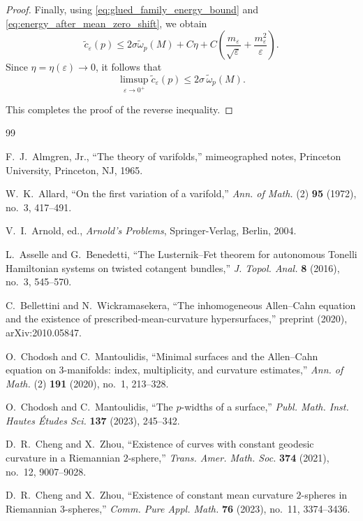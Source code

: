 \documentclass[12pt,english]{article}
\theoremstyle{definition}
\begin{document}
\begin{proof}
Finally, using \eqref{eq:glued_family_energy_bound} and
\eqref{eq:energy_after_mean_zero_shift}, we obtain
\[
\tilde c_\varepsilon(p)
\le
2\sigma\tilde\omega_p(M)+C\eta
+
C\left(\frac{m_\varepsilon}{\sqrt{\varepsilon}}+\frac{m_\varepsilon^2}{\varepsilon}\right).
\]
Since $\eta=\eta(\varepsilon)\to 0$, it follows that
\[
\limsup_{\varepsilon\to0^+}\tilde c_\varepsilon(p)\le 2\sigma\,\tilde\omega_p(M).
\]

This completes the proof of the reverse inequality.
\end{proof}


\begin{thebibliography}{99}

 F.~J.~Almgren, Jr., ``The theory of varifolds,'' mimeographed notes, Princeton University, Princeton, NJ, 1965.

 W.~K.~Allard, ``On the first variation of a varifold,'' \textit{Ann. of Math.} (2) \textbf{95} (1972), no.~3, 417--491.

 V.~I.~Arnold, ed., \textit{Arnold's Problems}, Springer-Verlag, Berlin, 2004.

 L.~Asselle and G.~Benedetti, ``The Lusternik--Fet theorem for autonomous Tonelli Hamiltonian systems on twisted cotangent bundles,'' \textit{J. Topol. Anal.} \textbf{8} (2016), no.~3, 545--570.

 C.~Bellettini and N.~Wickramasekera, ``The inhomogeneous Allen--Cahn equation and the existence of prescribed-mean-curvature hypersurfaces,'' preprint (2020), arXiv:2010.05847.

 O.~Chodosh and C.~Mantoulidis, ``Minimal surfaces and the Allen--Cahn equation on 3-manifolds: index, multiplicity, and curvature estimates,'' \textit{Ann. of Math.} (2) \textbf{191} (2020), no.~1, 213--328.

 O.~Chodosh and C.~Mantoulidis, ``The $p$-widths of a surface,'' \textit{Publ. Math. Inst. Hautes \'Etudes Sci.} \textbf{137} (2023), 245--342.

 D.~R.~Cheng and X.~Zhou, ``Existence of curves with constant geodesic curvature in a Riemannian $2$-sphere,'' \textit{Trans. Amer. Math. Soc.} \textbf{374} (2021), no.~12, 9007--9028.

 D.~R.~Cheng and X.~Zhou, ``Existence of constant mean curvature $2$-spheres in Riemannian $3$-spheres,'' \textit{Comm. Pure Appl. Math.} \textbf{76} (2023), no.~11, 3374--3436.


\end{thebibliography}
\end{document}
